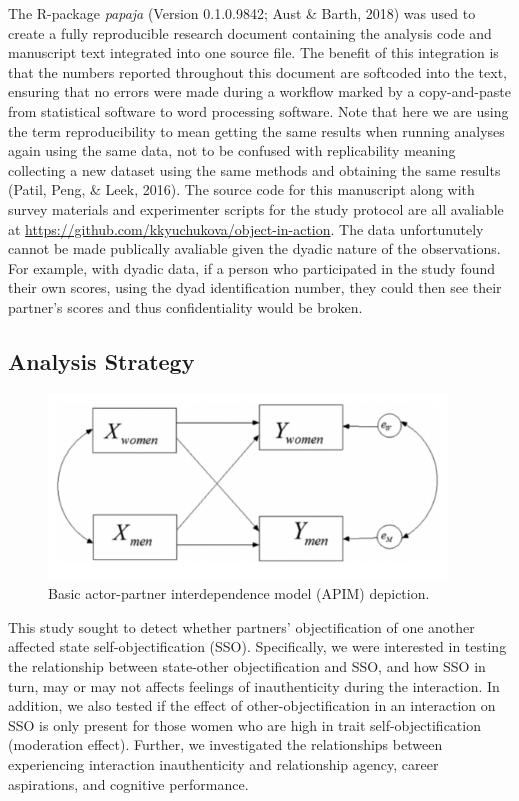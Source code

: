 \documentclass[man]{apa6}
\begin{document}
The R-package \emph{papaja} (Version 0.1.0.9842; Aust \& Barth, 2018)
was used to create a fully reproducible research document containing the
analysis code and manuscript text integrated into one source file. The
benefit of this integration is that the numbers reported throughout this
document are softcoded into the text, ensuring that no errors were made
during a workflow marked by a copy-and-paste from statistical software
to word processing software. Note that here we are using the term
reproducibility to mean getting the same results when running analyses
again using the same data, not to be confused with replicability meaning
collecting a new dataset using the same methods and obtaining the same
results (Patil, Peng, \& Leek, 2016). The source code for this
manuscript along with survey materials and experimenter scripts for the
study protocol are all avaliable at
\url{https://github.com/kkyuchukova/object-in-action}. The data
unfortunutely cannot be made publically avaliable given the dyadic
nature of the observations. For example, with dyadic data, if a person
who participated in the study found their own scores, using the dyad
identification number, they could then see their partner's scores and
thus confidentiality would be broken.

\subsection{Analysis Strategy}\label{analysis-strategy}

\begin{figure}
\includegraphics[width=400px]{APIM_figure} \caption{Basic actor-partner interdependence model (APIM) depiction.}\label{fig:apim}
\end{figure}

This study sought to detect whether partners' objectification of one
another affected state self-objectification (SSO). Specifically, we were
interested in testing the relationship between state-other
objectification and SSO, and how SSO in turn, may or may not affects
feelings of inauthenticity during the interaction. In addition, we also
tested if the effect of other-objectification in an interaction on SSO
is only present for those women who are high in trait
self-objectification (moderation effect). Further, we investigated the
relationships between experiencing interaction inauthenticity and
relationship agency, career aspirations, and cognitive performance.
\end{document}
